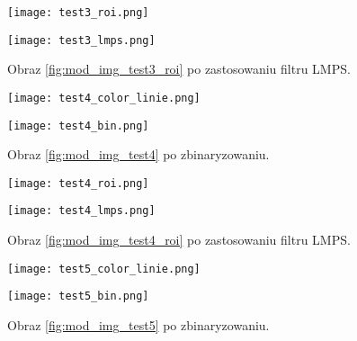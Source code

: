 \begin{figure}
	\begin{minipage}{0.48\textwidth}
		\centering
		\texttt{[image: test3\_roi.png]}
		\caption{Obraz \ref{fig:mod_img_test3_bin} po wyznaczeniu ROI.}
		\label{fig:mod_img_test3_roi}
	\end{minipage}
	\begin{minipage}{0.48\textwidth}
		\centering
		\texttt{[image: test3\_lmps.png]}
		\caption{Obraz \ref{fig:mod_img_test3_roi} po zastosowaniu filtru LMPS.}
		\label{fig:mod_img_test3_lmps}
	\end{minipage}
\end{figure}



\begin{figure}
	\begin{minipage}{0.48\textwidth}
		\centering
		\texttt{[image: test4\_color\_linie.png]}
		\caption{Obraz prostej drogi z refleksami wraz z naniesionymi środkami ciężkości oraz wykrytymi liniami.}
		\label{fig:mod_img_test4}
	\end{minipage}
	\begin{minipage}{0.48\textwidth}
		\centering
		\texttt{[image: test4\_bin.png]}
		\caption{Obraz \ref{fig:mod_img_test4} po zbinaryzowaniu.}
		\label{fig:mod_img_test4_bin}
	\end{minipage}
\end{figure}

\begin{figure}
	\begin{minipage}{0.48\textwidth}
		\centering
		\texttt{[image: test4\_roi.png]}
		\caption{Obraz \ref{fig:mod_img_test4_bin} po wyznaczeniu ROI.}
		\label{fig:mod_img_test4_roi}
	\end{minipage}
	\begin{minipage}{0.48\textwidth}
		\centering
		\texttt{[image: test4\_lmps.png]}
		\caption{Obraz \ref{fig:mod_img_test4_roi} po zastosowaniu filtru LMPS.}
		\label{fig:mod_img_test4_lmps}
	\end{minipage}
\end{figure}



\begin{figure}
	\begin{minipage}{0.48\textwidth}
		\centering
		\texttt{[image: test5\_color\_linie.png]}
		\caption{Obraz prostej drogi z mocno zacienionym pasem ruchu, wraz z naniesionymi środkami ciężkości oraz wykrytymi liniami.}
		\label{fig:mod_img_test5}
	\end{minipage}
	\begin{minipage}{0.48\textwidth}
		\centering
		\texttt{[image: test5\_bin.png]}
		\caption{Obraz \ref{fig:mod_img_test5} po zbinaryzowaniu.}
		\label{fig:mod_img_test5_bin}
	\end{minipage}
\end{figure}

